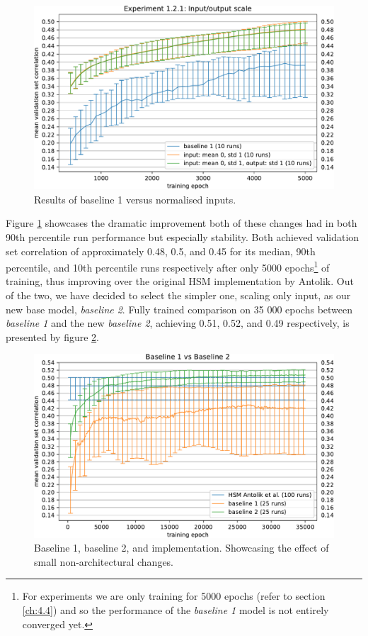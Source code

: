 \begin{figure}[H]
    \centering
    \includegraphics[width=1\textwidth]{../figures/05_1_2_1}
    \caption[Experiment 1.2.1]{Results of baseline 1 versus normalised inputs\protect\footnotemark.}
    \label{fig:5.1.2.1}
\end{figure}

Figure \ref{fig:5.1.2.1} showcases the dramatic improvement both of these changes had in both 90th percentile run performance but especially stability. Both achieved validation set correlation of approximately 0.48, 0.5, and 0.45 for its median, 90th percentile, and 10th percentile runs respectively after only 5000 epochs\footnote{For experiments we are only training for 5000 epochs (refer to section  \ref{ch:4.4}) and so the performance of the \emph{baseline 1} model is not entirely converged yet.} of training, thus improving over the original HSM implementation by Antolik. Out of the two, we have decided to select the simpler one, scaling only input, as our new base model, \emph{baseline 2}. Fully trained comparison on 35 000 epochs between \emph{baseline 1} and the new \emph{baseline 2}, achieving 0.51, 0.52, and 0.49 respectively, is presented by figure \ref{fig:5.1.2.1_2}.

\begin{figure}[H]
    \centering
    \includegraphics[width=1\textwidth]{../figures/05_1_2_1_2}
    \caption[Experiment 1.2.1 2]{Baseline 1, baseline 2, and \citeauthor{antolik} implementation. Showcasing the effect of small non-architectural changes.}
    \label{fig:5.1.2.1_2}
\end{figure}

